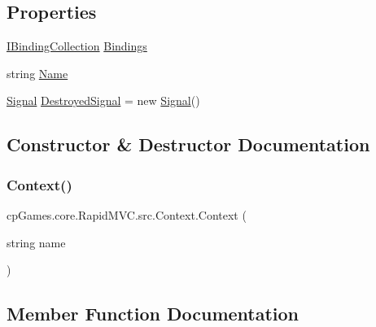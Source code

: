 \subsection*{Properties}
\begin{DoxyCompactItemize}
\item 
\mbox{\hyperlink{interfacecp_games_1_1core_1_1_rapid_m_v_c_1_1_i_binding_collection}{I\+Binding\+Collection}} \mbox{\hyperlink{classcp_games_1_1core_1_1_rapid_m_v_c_1_1src_1_1_context_a384417c0e49c2da2aa6c6a5ca335786c}{Bindings}}
\item 
string \mbox{\hyperlink{classcp_games_1_1core_1_1_rapid_m_v_c_1_1src_1_1_context_a5e2a8abd51dae0bace9004b876502809}{Name}}
\item 
\mbox{\hyperlink{classcp_games_1_1core_1_1_rapid_m_v_c_1_1_signal}{Signal}} \mbox{\hyperlink{classcp_games_1_1core_1_1_rapid_m_v_c_1_1src_1_1_context_a67d3c163319666084e17064386055f57}{Destroyed\+Signal}} = new \mbox{\hyperlink{classcp_games_1_1core_1_1_rapid_m_v_c_1_1_signal}{Signal}}()
\end{DoxyCompactItemize}


\subsection{Constructor \& Destructor Documentation}
\mbox{\label{classcp_games_1_1core_1_1_rapid_m_v_c_1_1src_1_1_context_a6d5ad4907289280bed9944c9bfa43184}} 
\subsubsection{\texorpdfstring{Context()}{Context()}}
{\footnotesize\ttfamily cp\+Games.\+core.\+Rapid\+M\+V\+C.\+src.\+Context.\+Context (\begin{DoxyParamCaption}\item[{string}]{name }\end{DoxyParamCaption})}



\subsection{Member Function Documentation}
\mbox{\label{classcp_games_1_1core_1_1_rapid_m_v_c_1_1src_1_1_context_a47ae1588b3891b1cd10bd102e2799465}} 
